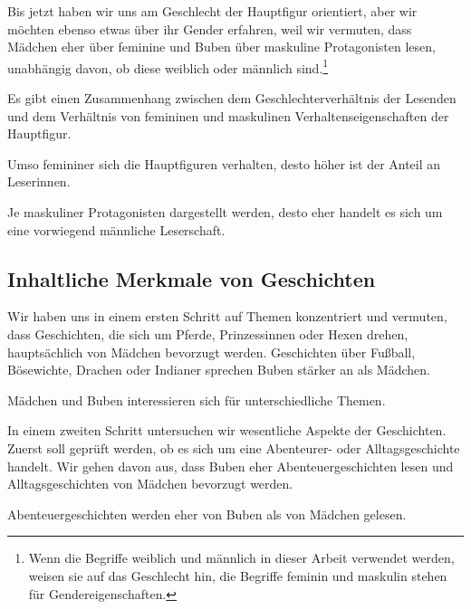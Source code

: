 Bis jetzt haben wir uns am Geschlecht der Hauptfigur orientiert, aber
wir möchten ebenso etwas über ihr Gender erfahren, weil wir vermuten,
dass Mädchen eher über feminine und Buben über maskuline Protagonisten
lesen, unabhängig davon, ob diese weiblich oder männlich
sind.\footnote{Wenn die Begriffe weiblich und männlich in dieser Arbeit verwendet werden, weisen sie auf das Geschlecht hin, die Begriffe feminin und maskulin stehen für Gendereigenschaften.}

\begin{hyp}\label{h3} Es gibt einen Zusammenhang zwischen dem Geschlechterverhältnis der Lesenden und dem Verhältnis von femininen und maskulinen Verhaltenseigenschaften der Hauptfigur. \end{hyp}

\begin{subhyp}\label{h3.1} 
  Umso femininer sich die Hauptfiguren verhalten, desto höher ist der Anteil an Leserinnen.\end{subhyp}

\begin{subhyp}\label{h3.2} Je maskuliner Protagonisten dargestellt werden, desto eher handelt es sich um eine vorwiegend männliche Leserschaft.\end{subhyp}

\subsection{Inhaltliche Merkmale von Geschichten}

Wir haben uns in einem ersten Schritt auf Themen konzentriert und
vermuten, dass Geschichten, die sich um Pferde, Prinzessinnen oder Hexen
drehen, hauptsächlich von Mädchen bevorzugt werden. Geschichten über
Fußball, Bösewichte, Drachen oder Indianer sprechen Buben stärker an als
Mädchen.

\begin{hyp}\label{hyp:themen} Mädchen und Buben interessieren sich für unterschiedliche Themen. \end{hyp}

In einem zweiten Schritt untersuchen wir wesentliche Aspekte der
Geschichten. Zuerst soll geprüft werden, ob es sich um eine Abenteurer-
oder Alltagsgeschichte handelt. Wir gehen davon aus, dass Buben eher
Abenteuergeschichten lesen und Alltagsgeschichten von Mädchen bevorzugt
werden.

\begin{subhyp}\label{h4.1} Abenteuergeschichten werden eher von Buben als von Mädchen gelesen. \end{subhyp}

